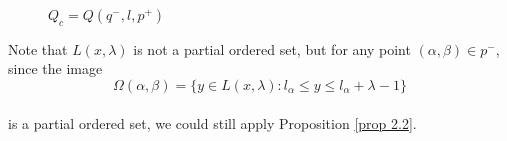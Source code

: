 \documentclass[a4paper, reqno]{amsart}
\theoremstyle{definition}
\theoremstyle{remark}
\numberwithin{equation}{section}
\begin{document}
\begin{figure}[H]
{
    }
    \caption{$Q_c = Q(q^{-},l,p^{+}) $}

\end{figure}

Note that $L(x,\lambda)$ is not a partial ordered set, but for any point $ (\alpha,\beta) \in p^{-}$, since the image\\ 
$$\Omega(\alpha,\beta) = \{y\in L(x,\lambda): l_{\alpha}\leq y\leq l_{\alpha}+\lambda-1 \}$$\\
is a partial ordered set, we could still apply Proposition \ref{prop 2.2}. 
\end{document}
